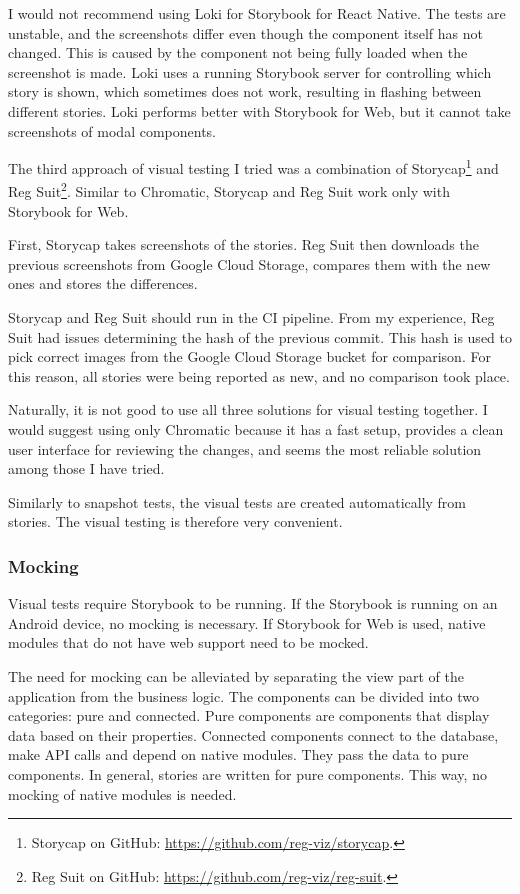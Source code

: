 \documentclass[
  printed, %
  table,   %
  oneside, %
  lof,     %
  lot,     %
]{fithesis3}
\begin{document}
I would not recommend using Loki for Storybook for React Native. The tests are unstable, and the screenshots differ even though the component itself has not changed. This is caused by the component not being fully loaded when the screenshot is made. Loki uses a running Storybook server for controlling which story is shown, which sometimes does not work, resulting in flashing between different stories.
Loki performs better with Storybook for Web, but it cannot take screenshots of modal components.

The third approach of visual testing I tried was a combination of Storycap\footnote{Storycap on GitHub: \url{https://github.com/reg-viz/storycap}.} and Reg Suit\footnote{Reg Suit on GitHub: \url{https://github.com/reg-viz/reg-suit}.}. Similar to Chromatic, Storycap and Reg Suit work only with Storybook for Web.

First, Storycap takes screenshots of the stories. Reg Suit then downloads the previous screenshots from Google Cloud Storage, compares them with the new ones and stores the differences. 

Storycap and Reg Suit should run in the CI pipeline. From my experience, Reg Suit had issues determining the hash of the previous commit. This hash is used to pick correct images from the Google Cloud Storage bucket for comparison. For this reason, all stories were being reported as new, and no comparison took place.

Naturally, it is not good to use all three solutions for visual testing together. I would suggest using only Chromatic because it has a fast setup, provides a clean user interface for reviewing the changes, and seems the most reliable solution among those I have tried.

Similarly to snapshot tests, the visual tests are created automatically from stories. The visual testing is therefore very convenient.

\subsubsection{Mocking}
Visual tests require Storybook to be running. If the Storybook is running on an Android device, no mocking is necessary. If Storybook for Web is used, native modules that do not have web support need to be mocked.

The need for mocking can be alleviated by separating the view part of the application from the business logic.
The components can be divided into two categories: pure and connected. Pure components are components that display data based on their properties. Connected components connect to the database, make API calls and depend on native modules. They pass the data to pure components. In general, stories are written for pure components. This way, no mocking of native modules is needed.
\end{document}
